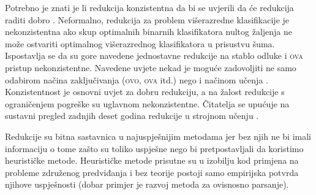 Potrebno je znati je li redukcija konzistentna  da bi se
uvjerili da će redukcija raditi dobro \citep{beygelzimer2009error,
daume15reductions}. Neformalno, redukcija za problem višerazredne klasifikacije
je nekonzistentna ako skup optimalnih binarnih klasifikatora nultog žaljenja
 ne može ostvariti optimalnog
višerazrednog klasifikatora u prisustvu šuma. Ispostavlja se da su gore navedene
jednostavne redukcije na stablo odluke i \textsc{ova} pristup nekonzistentne.
Navedene uvjete nekad je moguće zadovoljiti ne samo odabirom načina
zaključivanja (\textsc{ovo}, \textsc{ova} itd.) nego i načinom učenja
\citep{abe2004iterative, beygelzimer2005weighted}. Konzistentnost je osnovni
uvjet za dobru redukciju, a na žalost redukcije s ograničenjem pogreške su
uglavnom nekonzistentne. Čitatelja se upućuje na sustavni pregled zadnjih deset
godina redukcije u strojnom učenju \citep{daume15reductions}.

Redukcije su bitna sastavnica u najuspješnijim \lts{} metodama jer bez njih ne
bi imali informaciju o tome zašto su toliko uspješne nego bi pretpostavljali da
koristimo heurističke metode. Heurističke metode prisutne su u izobilju kod
primjena na probleme združenog predviđanja i bez teorije postoji samo empirijska
potvrda njihove uspješnosti (dobar primjer je razvoj metoda za ovisnosno
parsanje).
